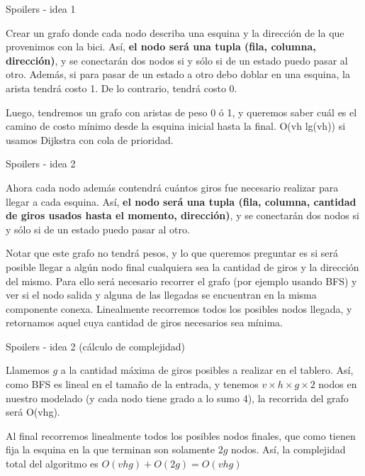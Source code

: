 \documentclass[compress]{beamer}
\begin{document}
\begin{frame}{Spoilers - idea 1}

Crear un grafo donde cada nodo describa una esquina y la direcci\'on de la que provenimos con la bici. As\'i, {\bf el nodo ser\'a una tupla (fila, columna, direcci\'on)}, y se conectar\'an dos nodos si y s\'olo si de un estado puedo pasar al otro. Adem\'as, si para pasar de un estado a otro debo doblar en una esquina, la arista tendr\'a costo 1. De lo contrario, tendr\'a costo 0.
\bigskip

Luego, tendremos un grafo con aristas de peso 0 \'o 1, y queremos saber cu\'al es el camino de costo m\'inimo desde la esquina inicial hasta la final. O(vh lg(vh)) si usamos Dijkstra con cola de prioridad.

\end{frame}


\begin{frame}{Spoilers - idea 2}

Ahora cada nodo adem\'as contendr\'a cu\'antos giros fue necesario realizar para llegar a cada esquina. As\'i, {\bf el nodo ser\'a una tupla (fila, columna, cantidad de giros usados hasta el momento, direcci\'on)}, y se conectar\'an dos nodos si y s\'olo si de un estado puedo pasar al otro.
\bigskip

Notar que este grafo no tendr\'a pesos, y lo que queremos preguntar es si ser\'a posible llegar a alg\'un nodo final cualquiera sea la cantidad de giros y la direcci\'on del mismo. Para ello ser\'a necesario recorrer el grafo (por ejemplo usando BFS) y ver si el nodo salida y alguna de las llegadas se encuentran en la misma componente conexa. Linealmente recorremos todos los posibles nodos llegada, y retornamos aquel cuya cantidad de giros necesarios sea m\'inima. \bigskip

\end{frame}

\begin{frame}{Spoilers - idea 2 (c\'alculo de complejidad)}

Llamemos $g$ a la cantidad m\'axima de giros posibles a realizar en el tablero.
As\'i, como BFS es lineal en el tama\~no de la entrada, y tenemos $v \times h \times g \times 2$ nodos en nuestro modelado (y cada nodo tiene grado a lo sumo 4), la recorrida del grafo ser\'a O(vhg).
\bigskip

Al final recorremos linealmente todos los posibles nodos finales, que como tienen fija la esquina en la que terminan son solamente $2g$ nodos. As\'i, la complejidad total del algoritmo es $O(vhg) + O(2g) = O(vhg)$
\end{frame}
\end{document}

